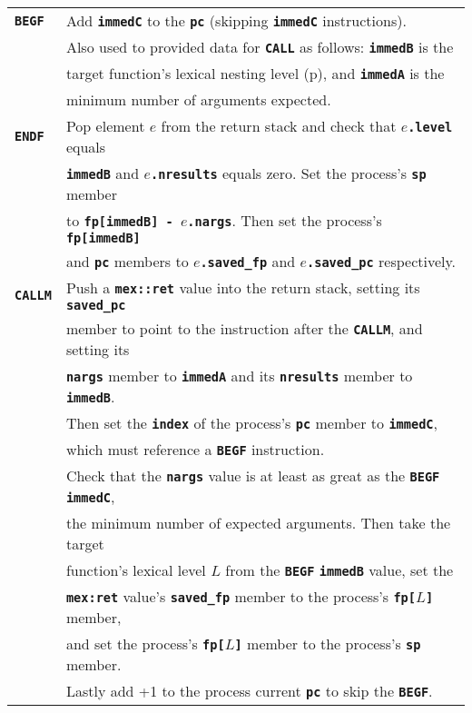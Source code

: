 \documentclass[12pt]{article}
\newcommand{\TT}[1]{{\tt \bfseries #1}}
\newcommand{\pagref}[1]{p\pageref{#1}}
\newlength{\figurewidth}
\newenvironment{boxedfigure}[1][!btp]%
	{\begin{figure*}[#1]
	 \begin{lrbox}{\figurebox}
	 \begin{minipage}{\figurewidth}

	 \vspace*{1ex}}%
	{
	 \vspace*{1ex}

	 \end{minipage}
	 \end{lrbox}

	 \centering
	 \fbox{\hspace*{0.1in}\usebox{\figurebox}\hspace*{0.1in}}
	 \end{figure*}}
\begin{document}
\begin{boxedfigure}

\begin{center}
\begin{tabular}{|l|l|}
\hline
\TT{BEGF}
    & Add \TT{immedC} to the \TT{pc} (skipping \TT{immedC} instructions).
    \\[0.5ex]
    & Also used to provided data for \TT{CALL} as follows: \TT{immedB} is the \\
    & target function's lexical nesting level (\pagref{LEXICAL-NESTING-LEVEL}),
      and \TT{immedA} is the \\
    & minimum number of arguments expected.
\\\hline
\TT{ENDF}
    & Pop element $e$ from the return stack and check that \TT{$e$.level}
      equals \\
    & \TT{immedB} and \TT{$e$.nresults} equals zero.  Set the process's
       \TT{sp} member \\
    & to \TT{fp[immedB] - $e$.nargs}.  Then set the process's \TT{fp[immedB]} \\
    & and \TT{pc} members to \TT{$e$.saved\_fp} and \TT{$e$.saved\_pc}
      respectively.
\\\hline
\TT{CALLM}
    & Push a \TT{mex::ret} value into the return stack, setting its
      \TT{saved\_pc} \\
    & member to point to the instruction after the \TT{CALLM},
      and setting its \\
    & \TT{nargs} member to \TT{immedA} and its \TT{nresults} member
      to \TT{immedB}.  \\
    & Then set the \TT{index} of the process's \TT{pc} member to \TT{immedC}, \\
    & which must reference a \TT{BEGF} instruction.
    \\[0.5ex]
    & Check that the \TT{nargs} value is at least as great as the \TT{BEGF}
      \TT{immedC}, \\
    & the minimum number of expected arguments.  Then take the target \\
    & function's lexical level $L$ from the \TT{BEGF} \TT{immedB} value,
      set the \\
    & \TT{mex:ret} value's \TT{saved\_fp} member to the process's
      \TT{fp[$L$]} member, \\
    & and set the process's \TT{fp[$L$]} member to the process's
      \TT{sp} member.
    \\[0.5ex]
    & Lastly add +1 to the process current \TT{pc} to skip the \TT{BEGF}.

\end{tabular}
\end{center}
\end{boxedfigure}
\end{document}
